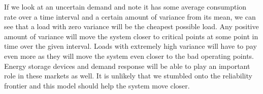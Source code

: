 If we look at an uncertain demand and note it has some average consumption rate over a time interval and a certain amount of variance from its mean, we can see that a load with zero variance will be the cheapest possible load.  Any positive amount of variance will move the system closer to critical points at some point in time over the given interval.  Loads with extremely high variance will have to pay even more as they will move the system even closer to the bad operating points.  Energy storage devices and demand response will be able to play an important role in these markets as well.  It is unlikely that we stumbled onto the reliability frontier and this model should help the system move closer.  

